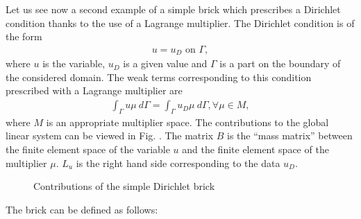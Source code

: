 \documentclass[a4paper,11pt,english]{sphinxmanual}
\begin{document}
Let us see now a second example of a simple brick which prescribes a Dirichlet
condition thanks to the use of a Lagrange multiplier. The Dirichlet condition is
of the form
\begin{equation*}
\begin{split}u = u_D \text{ on } \Gamma,\end{split}
\end{equation*}
where \(u\) is the variable, \(u_D\) is a given value and \(\Gamma\)
is a part on the boundary of the considered domain. The weak terms corresponding
to this condition prescribed with a Lagrange multiplier are
\begin{equation*}
\begin{split}\int_{\Gamma} u \mu\ d\Gamma = \int_{\Gamma} u_D \mu\ d\Gamma, \forall \mu \in M,\end{split}
\end{equation*}
where \(M\) is an appropriate multiplier space. The contributions to the
global linear system can be viewed in Fig. {\hyperref[\detokenize{userdoc/model_object:ud-fig-syslindir}]{}}. The matrix
\(B\) is the “mass matrix” between the finite element space of the variable
\(u\) and the finite element space of the multiplier \(\mu\).
\(L_{u}\) is the right hand side corresponding to the data \(u_D\).

\begin{figure}[htbp]
\centering
\capstart

\noindent{}
\caption{Contributions of the simple Dirichlet brick}\label{\detokenize{userdoc/model_object:id2}}\label{\detokenize{userdoc/model_object:ud-fig-syslindir}}\end{figure}

The brick can be defined as follows:
\end{document}
